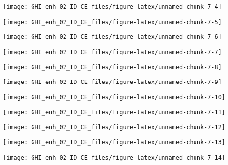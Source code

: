 \documentclass[
  10pt,
  a4paper,oneside]{article}
\begin{document}
\begin{center}\texttt{[image: GHI\_enh\_02\_ID\_CE\_files/figure-latex/unnamed-chunk-7-4]} \end{center}

\begin{center}\texttt{[image: GHI\_enh\_02\_ID\_CE\_files/figure-latex/unnamed-chunk-7-5]} \end{center}

\begin{center}\texttt{[image: GHI\_enh\_02\_ID\_CE\_files/figure-latex/unnamed-chunk-7-6]} \end{center}

\begin{center}\texttt{[image: GHI\_enh\_02\_ID\_CE\_files/figure-latex/unnamed-chunk-7-7]} \end{center}

\begin{center}\texttt{[image: GHI\_enh\_02\_ID\_CE\_files/figure-latex/unnamed-chunk-7-8]} \end{center}

\begin{center}\texttt{[image: GHI\_enh\_02\_ID\_CE\_files/figure-latex/unnamed-chunk-7-9]} \end{center}

\begin{center}\texttt{[image: GHI\_enh\_02\_ID\_CE\_files/figure-latex/unnamed-chunk-7-10]} \end{center}

\begin{center}\texttt{[image: GHI\_enh\_02\_ID\_CE\_files/figure-latex/unnamed-chunk-7-11]} \end{center}

\begin{center}\texttt{[image: GHI\_enh\_02\_ID\_CE\_files/figure-latex/unnamed-chunk-7-12]} \end{center}

\begin{center}\texttt{[image: GHI\_enh\_02\_ID\_CE\_files/figure-latex/unnamed-chunk-7-13]} \end{center}

\begin{center}\texttt{[image: GHI\_enh\_02\_ID\_CE\_files/figure-latex/unnamed-chunk-7-14]} \end{center}
\end{document}
